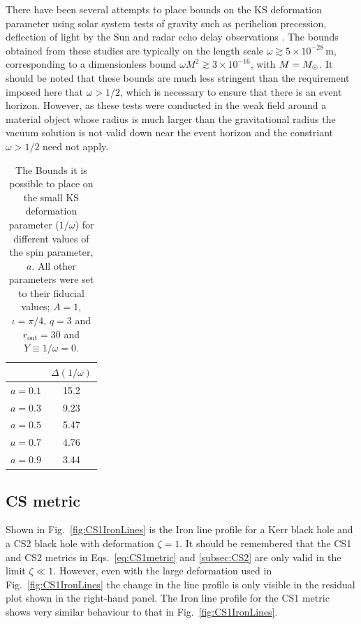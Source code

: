 There have been several attempts to place bounds on the KS deformation parameter using solar system tests of gravity such as perihelion precession, deflection of light by the Sun and radar echo delay observations \citep{2011GReGr..43.1401L,2011RSPSA.467.1390H,2011IJMPD..20.1079I}. The bounds obtained from these studies are typically on the length scale $\omega\gtrsim 5\times 10^{-28}\,\textrm{m}$, corresponding to a dimensionless bound $\omega M^{2} \gtrsim 3\times 10^{-16}$, with $M=M_{ \odot }$. It should be noted that these bounds are much less stringent than the requirement imposed here that $\omega>1/2$, which is necessary to ensure that there is an event horizon. However, as these tests were conducted in the weak field around a material object whose radius is much larger than the gravitational radius the vacuum solution is not valid down near the event horizon and the constriant $\omega>1/2$ need not apply.

\begin{table}[h]
\begin{center}
\begin{tabular}{ l | c  }
	&$\Delta (1/\omega)$\\
\hline
$a=0.1$ &  15.2 \\
$a=0.3$ &  9.23 \\
$a=0.5$ &  5.47 \\
$a=0.7$ &  4.76 \\
$a=0.9$ &  3.44 \\
\end{tabular}
\end{center}
\caption{The Bounds it is possible to place on the small KS deformation parameter ($1/\omega$) for different values of the spin parameter, $a$. All other parameters were set to their fiducial values; $A=1$, $\iota=\pi/4$, $q=3$ and $r_{\textrm{out}}=30$ and $Y\equiv 1/\omega=0$.}
\label{tab:KS}
\end{table}



\subsection{CS metric}\label{subsubsec:CS1res}
Shown in Fig.\ \ref{fig:CS1IronLines} is the Iron line profile for a Kerr black hole and a CS2 black hole with deformation $\zeta=1$. It should be remembered that the CS1 and CS2 metrics in Eqs.\ \ref{eq:CS1metric} and \ref{subsec:CS2} are only valid in the limit $\zeta\ll 1$. However, even with the large deformation used in Fig.\ \ref{fig:CS1IronLines} the change in the line profile is only visible in the residual plot shown in the right-hand panel. The Iron line profile for the CS1 metric shows very similar behaviour to that in Fig.\ \ref{fig:CS1IronLines}.

